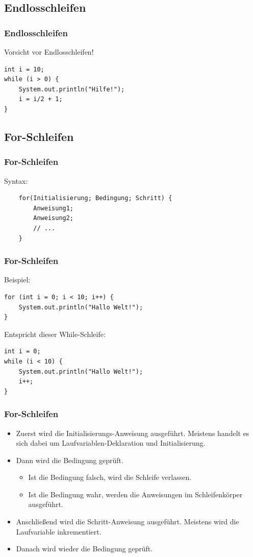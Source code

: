\documentclass[final]{beamer}
\begin{document}
\subsection{Endlosschleifen}
\begin{frame}[containsverbatim]
	\frametitle{Endlosschleifen}
	Vorsicht vor Endlosschleifen!
	\begin{lstlisting}
int i = 10;
while (i > 0) {
	System.out.println("Hilfe!");
	i = i/2 + 1;
}
	\end{lstlisting}
\end{frame}

\subsection{For-Schleifen}
\begin{frame}[containsverbatim]
	\frametitle{For-Schleifen}
	Syntax:
	\begin{lstlisting}
	for(Initialisierung; Bedingung; Schritt) {
		Anweisung1;
		Anweisung2;
		// ...
	}
	\end{lstlisting}
\end{frame}
\begin{frame}[containsverbatim]
	\frametitle{For-Schleifen}
	Beispiel:
	\begin{lstlisting}
for (int i = 0; i < 10; i++) {
	System.out.println("Hallo Welt!");
}
	\end{lstlisting}
	Entspricht dieser While-Schleife:
	\begin{lstlisting}
int i = 0;
while (i < 10) {
	System.out.println("Hallo Welt!");
	i++;
}
	\end{lstlisting}
\end{frame}
\begin{frame}
	\frametitle{For-Schleifen}
	\begin{itemize}
	\item{Zuerst wird die Initialisierungs-Anweisung ausgeführt.
		{\small Meistens handelt es sich dabei um Laufvariablen-Deklaration und Initialisierung.}
		}
		\item{Dann wird die Bedingung geprüft.
		\begin{itemize}
			\item{Ist die Bedingung falsch, wird die Schleife verlassen.}
			\item{Ist die Bedingung wahr, werden die Anweisungen im Schleifenkörper ausgeführt.}
		\end{itemize}}
		\item{Anschließend wird die Schritt-Anweisung ausgeführt.
		{\small Meistens wird die Laufvariable inkrementiert.}
		}
		\item{Danach wird wieder die Bedingung geprüft.}
	\end{itemize}
\end{frame}
\end{document}
